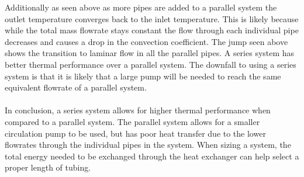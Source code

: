 %
\noindent
Additionally as seen above as more pipes are added to a parallel system the outlet temperature converges back to the inlet temperature. This is likely because while the total mass flowrate stays constant the flow through each individual pipe decreases and causes a drop in the convection coefficient. The jump seen above shows the transition to laminar flow in all the parallel pipes. A series system has better thermal performance over a parallel system. The downfall to using a series system is that it is likely that a large pump will be needed to reach the same equivalent flowrate of a parallel system. \\ \\
%
In conclusion, a series system allows for higher thermal performance when compared to a parallel system. The parallel system allows for a smaller circulation pump to be used, but has poor heat transfer due to the lower flowrates through the individual pipes in the system. When sizing a system, the total energy needed to be exchanged through the heat exchanger can help select a proper length of tubing.

